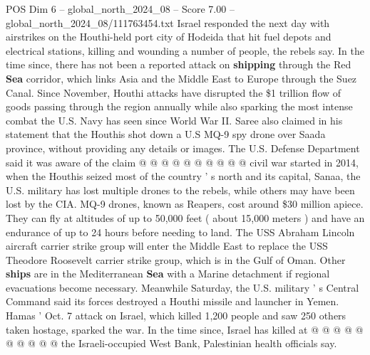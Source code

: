 \begin{textsample}{POS Dim 6 – global\_north\_2024\_08 – Score 7.00 – global\_north\_2024\_08/111763454.txt}
Israel responded the next day with airstrikes on the Houthi-held port city of Hodeida that hit fuel depots and electrical stations, killing and wounding a number of people, the rebels say.
In the time since, there has not been a reported attack on \textbf{shipping} through the Red \textbf{Sea} corridor, which links Asia and the Middle East to Europe through the Suez Canal.
Since November, Houthi attacks have disrupted the \$1 trillion flow of goods passing through the region annually while also sparking the most intense combat the U.S.
Navy has seen since World War II.
Saree also claimed in his statement that the Houthis shot down a U.S MQ-9 spy drone over Saada province, without providing any details or images.
The U.S.
Defense Department said it was aware of the claim @ @ @ @ @ @ @ @ @ @ civil war started in 2014, when the Houthis seized most of the country ' s north and its capital, Sanaa, the U.S. military has lost multiple drones to the rebels, while others may have been lost by the CIA.
MQ-9 drones, known as Reapers, cost around \$30 million apiece.
They can fly at altitudes of up to 50,000 feet ( about 15,000 meters ) and have an endurance of up to 24 hours before needing to land.
The USS Abraham Lincoln aircraft carrier strike group will enter the Middle East to replace the USS Theodore Roosevelt carrier strike group, which is in the Gulf of Oman.
Other \textbf{ships} are in the Mediterranean \textbf{Sea} with a Marine detachment if regional evacuations become necessary.
Meanwhile Saturday, the U.S. military ' s Central Command said its forces destroyed a Houthi missile and launcher in Yemen.
Hamas ' Oct. 7 attack on Israel, which killed 1,200 people and saw 250 others taken hostage, sparked the war.
In the time since, Israel has killed at @ @ @ @ @ @ @ @ @ @ the Israeli-occupied West Bank, Palestinian health officials say.

\end{textsample}
